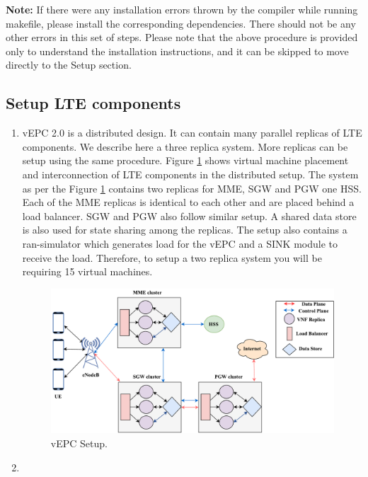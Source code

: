 \pdfminorversion=4\documentclass[hidelinks]{report}
\begin{document}
\textbf{Note:} If there were any installation errors thrown by the compiler while running makefile, please install the corresponding dependencies. There should not be any other errors in this set of steps. Please note that the above procedure is provided only to understand the installation instructions, and it can be skipped to move directly to the Setup section.

\subsection*{Setup LTE components}

\begin{enumerate}


\item vEPC 2.0 is a distributed design. It can contain many parallel replicas of LTE components. We describe here a three replica system. More replicas can be setup using the same procedure. Figure \ref{setup} shows virtual machine placement and interconnection of LTE components in the distributed setup. The system as per the Figure \ref{setup} contains two replicas for MME, SGW and PGW one HSS. Each of the MME replicas is identical to each other and are placed behind a load balancer. SGW and PGW also follow similar setup. A shared data store is also used for state sharing among the replicas. The setup also contains a ran-simulator which generates load for the vEPC and a SINK module to receive the load. Therefore, to setup a two replica system you will be requiring 15 virtual machines.  
\begin{figure}[H]

\centering
\includegraphics[scale=0.6]{images/depc}
\caption{vEPC Setup.}
\label{setup}

\end{figure}

\item


\end{enumerate}
\end{document}
